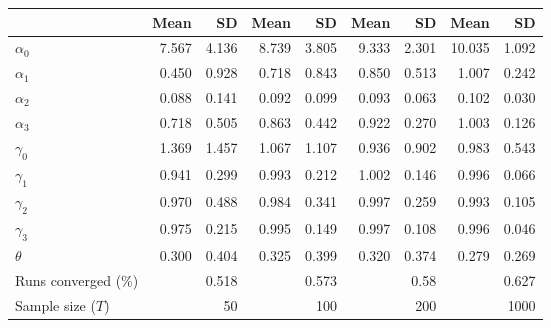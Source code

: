 
\begin{tabular}[t]{lrrrrrrrr}
\toprule
  & Mean & SD & Mean  & SD  & Mean   & SD   & Mean    & SD   \\
\midrule
$\alpha_{0}$ & 7.567 & 4.136 & 8.739 & 3.805 & 9.333 & 2.301 & 10.035 & 1.092\\
$\alpha_{1}$ & 0.450 & 0.928 & 0.718 & 0.843 & 0.850 & 0.513 & 1.007 & 0.242\\
$\alpha_{2}$ & 0.088 & 0.141 & 0.092 & 0.099 & 0.093 & 0.063 & 0.102 & 0.030\\
$\alpha_{3}$ & 0.718 & 0.505 & 0.863 & 0.442 & 0.922 & 0.270 & 1.003 & 0.126\\
$\gamma_{0}$ & 1.369 & 1.457 & 1.067 & 1.107 & 0.936 & 0.902 & 0.983 & 0.543\\
$\gamma_{1}$ & 0.941 & 0.299 & 0.993 & 0.212 & 1.002 & 0.146 & 0.996 & 0.066\\
$\gamma_{2}$ & 0.970 & 0.488 & 0.984 & 0.341 & 0.997 & 0.259 & 0.993 & 0.105\\
$\gamma_{3}$ & 0.975 & 0.215 & 0.995 & 0.149 & 0.997 & 0.108 & 0.996 & 0.046\\
$\theta$ & 0.300 & 0.404 & 0.325 & 0.399 & 0.320 & 0.374 & 0.279 & 0.269\\
Runs converged (\%) &  & 0.518 &  & 0.573 &  & 0.58 &  & 0.627\\
Sample size ($T$) &  & 50 &  & 100 &  & 200 &  & 1000\\
\bottomrule
\end{tabular}
